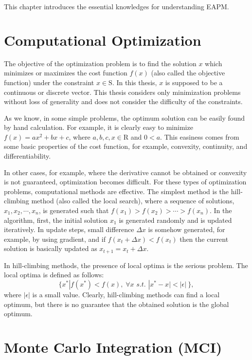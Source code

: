 This chapter introduces
the essential knowledges for understanding EAPM.

\section{Computational Optimization}
The objective of the optimization problem is 
to find the solution $x$ which minimizes or
maximizes the cost function $f(x)$
(also called the objective function)
under the constraint 
$x \in \mathrm{S}$.
In this thesis, $x$ is supposed to be 
a continuous or discrete vector.
This thesis considers only minimization problems without loss of
generality
and does not consider the difficulty of the constraints.

As we know, in some simple problems,
the optimum solution can  
be easily found by hand calculation.  
For example, it is clearly easy to minimize $f(x)=a x^2 + bx +c$, where
$a,b,c,x \in \mathrm{R}$ and $0<a$.
This easiness comes from some basic properties of the cost function,
for example,
convexity, continuity, and differentiability.

In other cases, for example, 
where the derivative cannot be obtained or convexity is not guaranteed, 
optimization becomes difficult.
For these types of optimization problems,
computational methods are effective.
The simplest method is the hill-climbing method (also called the local search), 
where a sequence of solutions, $x_1, x_2,\cdots , x_n$,
is generated such that $f(x_1)>f(x_2) > \cdots > f(x_n)$.
In the algorithm, first, the initial solution $x_1$ is generated
randomly and is updated iteratively.
In update steps, small difference $\Delta x$ is somehow generated,
for example, by using gradient,
and if $f(x_t+\Delta x)<f(x_t)$ then the current solution is basically
updated as $x_{t+1}=x_t+\Delta x$.

In hill-climbing methods, the presence of local optima is the serious
problem.
The local optima is defined as follows:
\begin{equation}
 \{x^*| f(x^*)<f(x), \; \forall x \,\, s.t. \,\, |x^* -x|<|\epsilon| \: \},
\end{equation}  
where $|\epsilon|$ is a small value.
Clearly, hill-climbing methods can find a local optimum,
but there is no guarantee that the obtained solution is the global
optimum.


\section{Monte Carlo Integration (MCI)}
